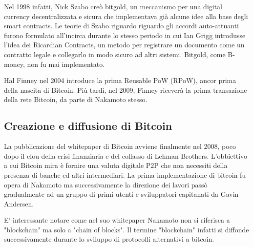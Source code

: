 Nel 1998 infatti, Nick Szabo creò bitgold, un meccanismo per una digital currency decentralizzata e sicura che implementava già alcune idee alla base degli smart contracts. Le teorie di Szabo riguardo riguardo gli accordi auto-attuanti furono formulato all'incirca durante lo stesso periodo in cui Ian Grigg introdusse l'idea dei Ricardian Contracts, un metodo per registrare un documento come un contratto legale e collegarlo in modo sicuro ad altri sistemi. Bitgold, come B-money, non fu mai implementato.
 
 Hal Finney nel 2004 introduce la prima Reusable PoW (RPoW), ancor prima della nascita di Bitcoin. Più tardi, nel 2009, Finney riceverà la prima transazione della rete Bitcoin, da parte di Nakamoto stesso. 

\subsection{Creazione e diffusione di Bitcoin}

La pubblicazione del whitepaper di Bitcoin avviene finalmente nel 2008, poco dopo il clou della crisi finanziaria e del collasso di Lehman Brothers. L'obbiettivo a cui Bitcoin mira è fornire una valuta digitale P2P che non necessiti della presenza di banche ed altri intermediari.  La prima implementazione di bitcoin fu opera di Nakamoto ma successivamente la direzione dei lavori passò gradualmente ad un gruppo di primi utenti e sviluppatori capitanati da Gavin Andersen. 

E' interessante notare come nel suo whitepaper Nakamoto non si riferisca a "blockchain" ma solo a "chain of blocks". Il termine "blockchain" infatti si diffonde successivamente durante lo sviluppo di protocolli alternativi a bitcoin. 

